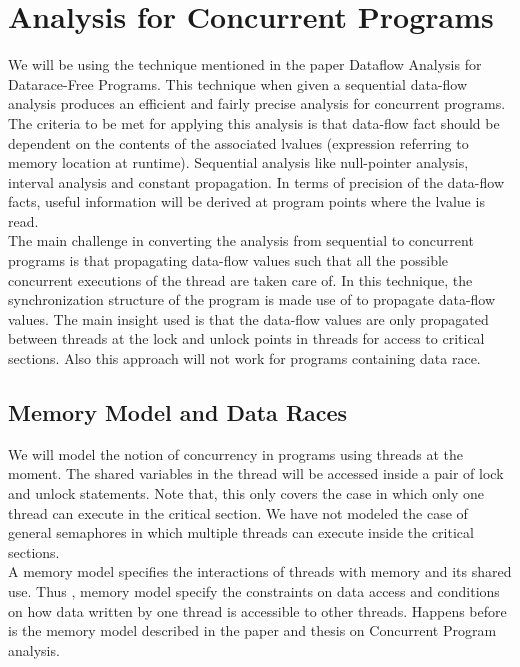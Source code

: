 \chapter{Analysis for Concurrent Programs}

We will be using the technique mentioned in the paper Dataflow Analysis for Datarace-Free Programs\cite{Arnab2006}. This technique when given a sequential data-flow analysis produces an efficient and fairly precise analysis for concurrent programs. The criteria to be met for applying this analysis is that data-flow fact should  be dependent on the contents of the associated lvalues (expression referring to memory location at runtime). Sequential analysis like null-pointer analysis, interval analysis and constant propagation. In terms of precision of the data-flow facts, useful information will be derived at program points where the lvalue is read.\cite{Arnab2006} \\

The main challenge in converting the analysis from sequential to concurrent programs is that propagating data-flow values such that all the possible concurrent executions of the thread are taken care of. In this technique, the synchronization structure of the program is made use of to propagate data-flow values. The main insight used is that the data-flow values are only propagated between threads at the lock and unlock points in threads for access to critical sections. Also this approach will not work for programs containing data race. \\

\section{Memory Model and Data Races}

We will model the notion of concurrency in programs using threads at the moment. The shared variables in the thread will be accessed inside a pair of lock and unlock statements. Note that, this only covers the case in which only one thread can execute in the critical section. We have not modeled the case of general semaphores in which multiple threads can execute inside the critical sections. \\

A memory model specifies the interactions of threads with memory and its shared use. Thus , memory model specify the constraints on data access and conditions on how data written by one thread is accessible to other threads. Happens before is the memory model described in the paper and thesis on Concurrent Program analysis. \\ 


